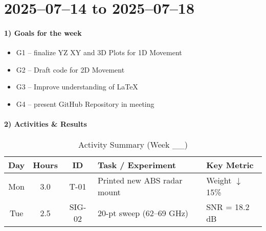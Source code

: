 \documentclass{article}
\begin{document}
\section*{2025--07--14 to 2025--07--18}

\paragraph{1) Goals for the week}
\begin{itemize}
 \item G1 -- finalize YZ XY and 3D Plots for 1D Movement
 \item G2 -- Draft code for 2D Movement
 \item G3 -- Improve understanding of LaTeX
 \item G4 -- present GitHub Repository in meeting
\end{itemize}

\paragraph{2) Activities \& Results}%
\begin{table}[htbp]
\caption{Activity Summary (Week \_\_)}
\label{tab:week_summary}
\centering
\begin{tabular}{|c|c|c|p{3.1cm}|p{2.1cm}|}
\hline
\textbf{Day} & \textbf{Hours} & \textbf{ID} & \textbf{Task / Experiment} & \textbf{Key Metric}\\
\hline
Mon & 3.0 & T-01 & Printed new ABS radar mount & Weight $\downarrow$15\% \\
Tue & 2.5 & SIG-02 & 20-pt sweep (62--69 GHz) & SNR = 18.2 dB \\
\hline
\end{tabular}
\end{table} 

\begin{comment}

\paragraph{6) Repository Snapshot}%
\vspace{-0.2em}
\begin{verbatim}
$ git rev-parse --short HEAD   # b3e9a1c
$ du -sh data/week__           # 2.3G radar_scan_Wk__.mat
\end{verbatim}
Raw data: \texttt{radar\_scan\_Wk\_\_.mat} (\SI{2.3}{GB}) \\
Processed voxels: \texttt{voxel\_Wk\_\_.npy} (\SI{740}{MB})

\end{comment}
\end{document}
